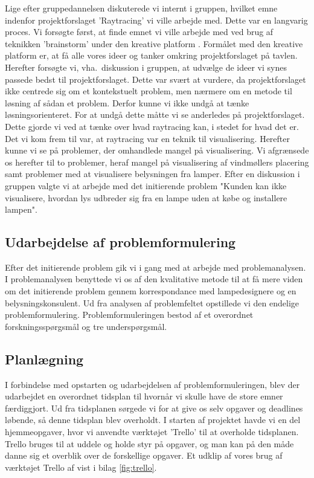 \documentclass[oneside,a4paper,titlepage]{article}
\begin{document}
Lige efter gruppedannelsen diskuterede vi internt i gruppen, hvilket emne indenfor projektforslaget 'Raytracing' vi ville arbejde med. Dette var en langvarig proces. Vi forsøgte først, at finde emnet vi ville arbejde med ved brug af teknikken 'brainstorm' under den kreative platform \cite{LASSE}. Formålet med den kreative platform er, at få alle vores ideer og tanker omkring projektforslaget på tavlen. Herefter forsøgte vi, vha.\ diskussion i gruppen, at udvælge de ideer vi synes passede bedst til projektforslaget. Dette var svært at vurdere, da projektforslaget ikke centrede sig om et kontekstuelt problem, men nærmere om en metode til løsning af sådan et problem. Derfor kunne vi ikke undgå at tænke løsningsorienteret. For at undgå dette måtte vi se anderledes på projektforslaget. Dette gjorde vi ved at tænke over hvad raytracing kan, i stedet for hvad det er. Det vi kom frem til var, at raytracing var en teknik til visualisering. Herefter kunne vi se på problemer, der omhandlede mangel på visualisering. Vi afgrænsede os herefter til to problemer, heraf mangel på visualisering af vindmøllers placering samt problemer med at visualisere belysningen fra lamper. Efter en diskussion i gruppen valgte vi at arbejde med det initierende problem "Kunden kan ikke visualisere, hvordan lys udbreder sig fra en lampe uden at købe og installere lampen". 

\subsection{Udarbejdelse af problemformulering}
Efter det initierende problem gik vi i gang med at arbejde med problemanalysen. I problemanalysen benyttede vi os af den kvalitative metode til at få mere viden om det initierende problem gennem korrespondance med lampedesignere og en belysningskonsulent. Ud fra analysen af problemfeltet opstillede vi den endelige problemformulering. Problemformuleringen bestod af et overordnet forskningsspørgsmål og tre underspørgsmål.

\subsection{Planlægning}
I forbindelse med opstarten og udarbejdelsen af problemformuleringen, blev der udarbejdet en overordnet tidsplan til hvornår vi skulle have de store emner færdiggjort. Ud fra tidsplanen sørgede vi for at give os selv opgaver og deadlines løbende, så denne tidsplan blev overholdt. I starten af projektet havde vi en del hjemmeopgaver, hvor vi anvendte værktøjet 'Trello' til at overholde tidsplanen. Trello bruges til at uddele og holde styr på opgaver, og man kan på den måde danne sig et overblik over de forskellige opgaver. Et udklip af vores brug af værktøjet Trello af vist i bilag \ref{fig:trello}. 
\newline
\end{document}
